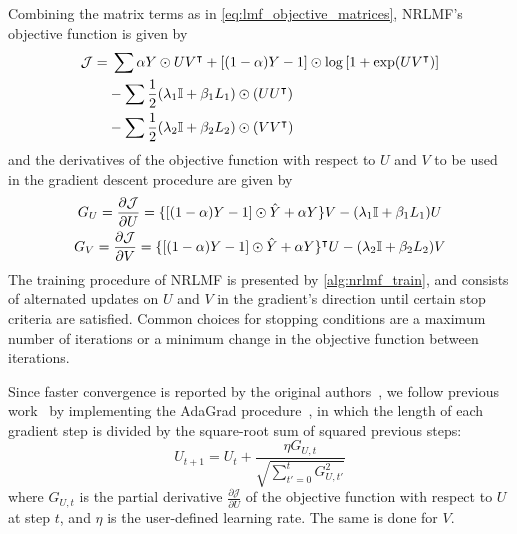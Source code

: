 Combining the matrix terms as in \autoref{eq:lmf_objective_matrices}, NRLMF's objective function is given by
%
\begin{equation}
    \begin{split}
        \mathcal{J} = &\; \sum
                \alpha Y \odot UV^\intercal
                + [(1 - \alpha) Y - 1] \odot \log \left[1+\exp(UV^\intercal)\right]\\
            &- \sum \frac{1}{2} (\lambda_1\mathbb{I} + \beta_1 L_1) \odot (U U^\intercal)\\
            &- \sum \frac{1}{2} (\lambda_2\mathbb{I} + \beta_2 L_2) \odot (V V^\intercal)
    \end{split}
    \label{eq:nrlmf_objective}
\end{equation}
%
and the derivatives of the objective function with respect to $U$ and $V$ to be used in the gradient descent procedure are given by
\begin{gather}
    G_U = \frac{\partial \mathcal{J}}{\partial U} =
        \{[(1 - \alpha) Y - 1] \odot \hat Y + \alpha Y\}V
        - (\lambda_1\mathbb{I} + \beta_1 L_1) U
    \label{eq:nrlmf_gradient_U}
    \\
    G_V = \frac{\partial \mathcal{J}}{\partial V} =
        \{[(1 - \alpha) Y - 1] \odot \hat Y + \alpha Y\}^\intercal U
        - (\lambda_2\mathbb{I} + \beta_2 L_2) V
    \label{eq:nrlmf_gradient_V}
\end{gather}
%
The training procedure of NRLMF is presented by \autoref{alg:nrlmf_train}, and consists of alternated updates on $U$ and $V$ in the gradient's direction until certain stop criteria are satisfied. Common choices for stopping conditions are a maximum number of iterations or a minimum change in the objective function between iterations.

Since faster convergence is reported by the original authors~\cite{johnsonlogistic}, we follow previous work~\cite{johnsonlogistic,liu2016neighborhood,hao2017predicting,li2019dnilmflda} by implementing the AdaGrad procedure~\cite{duchi2011adaptive}, in which the length of each gradient step is divided by the square-root sum of squared previous steps:
%
\begin{equation}
    U_{t+1} = U_t + \frac{\eta G_{U,t}}{\sqrt{\sum_{t'=0}^t G_{U,t'}^2}}
\end{equation}
%
where $G_{U,t}$ is the partial derivative $\frac{\partial\mathcal{J}}{\partial U}$ of the objective function with respect to $U$ at step $t$, and $\eta$ is the user-defined learning rate. The same is done for $V$.

